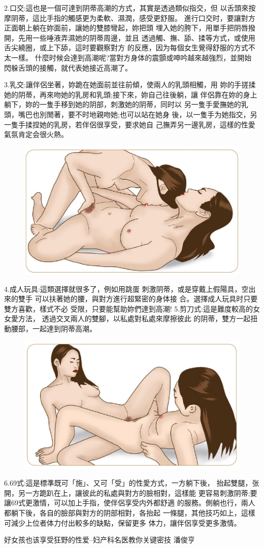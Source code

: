 \documentclass[12pt,UTF8]{ctexbook}
\begin{document}
2.口交:這也是一個可達到阴蒂高潮的方式，其實是透過類似指交，但
以舌頭來按摩阴蒂，這比手指的觸感更为柔軟、濕潤，感受更舒服。
進行口交时，要讓對方正面朝上躺在妳面前，讓她的雙膝彎起，妳把頭
埋入她的胯下，用單手把阴唇撥開，先用一些唾液弄濕她的阴蒂周邊，並且
透過觸、撫、舔、揉等方式，或使用舌尖繞圈，或上下舔，這时要觀察對方
的反應，因为每個女生覺得舒服的方式不太一樣。
什麼时候会達到高潮呢?當對方身体的震顫或呻吟越來越強烈，並開始
閃躲舌頭的接觸，就代表她接近高潮了。

3.乳交:讓伴侶坐著，妳跪在她面前並往前傾，使兩人的乳頭相觸，用
妳的手搓揉她的阴蒂，再來吻她的乳房和乳頭;接下來，妳自己往後躺，讓
伴侶靠在妳的身上躺下，妳的一隻手移到她的阴部，刺激她的阴蒂，同时以
另一隻手愛撫她的乳頭，嘴巴也別閒著，要不时地親吻她;也可以站在她身
後，以一隻手为她指交，另一隻手揉捏她的乳房，若伴侶很享受，要求她自
己撫弄另一邊乳房，這樣的性愛氣氛肯定会很火熱。

\begin{figure}[htbp]
	\centering
	\includegraphics[width=0.7\linewidth]{11}
	\caption{}
	\label{fig:1}
\end{figure}

4.成人玩具:這類選擇就很多了，例如用跳蛋
刺激阴蒂，或是穿戴上假陽具，空出來的雙手
可以扶著她的腰，與對方進行超緊密的身体接
合。選擇成人玩具时只要雙方喜歡，樣式不必
受限，只要能幫助妳們達到高潮!
5.剪刀式:這是難度較高的女女愛方法，
透過交叉兩人的雙腳，以私處對私處來摩擦彼此
的阴蒂，雙方一起扭動腰部，一起達到阴蒂高潮。

\begin{figure}[htbp]
	\centering
	\includegraphics[width=0.7\linewidth]{12}
	\caption{}
	\label{fig:1}
\end{figure}

6.69式:這是標準既可「施」、又可「受」的性愛方式，一方躺下後，
抬起雙腿，张開，另一方跪趴在上，讓彼此的私處與對方的臉相對，這樣能
更容易刺激阴蒂;要讓69式更激情，可以加上手指，使伴侶享受内外都舒適
的服務。側躺也行，兩人都躺下後，各自的臉部與對方的阴部相對，各抬起
一條腿，其他技巧如上，這樣可減少上位者体力付出較多的缺點，保留更多
体力，讓伴侶享受更多激情。



\backmatter

好女孩也该享受狂野的性爱--妇产科名医教你关键密技  潘俊亨
\end{document}
